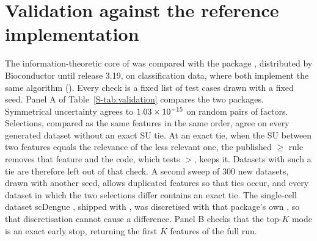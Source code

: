 \begin{table}[htbp]
\centering\footnotesize
\caption{ top-$K$ ($q = 2$), mRMR, MIM and mRMR on the two-bin target, and
the rankers at a matched panel size $K$ on the \SuppSimDatasets{} simulated datasets, as
means with Monte Carlo standard errors in brackets. Recovered: share of the three driver
clusters with a member selected. FDR: share of the selected features that are distractors
or noise. Copies: members of a driver cluster selected beyond the first. Exact: share of
folds that recover every driver cluster with no distractor or noise feature. Uno's C:
truncated.}
\label{S-tab:simmatched}

\end{table}

\section{Validation against the reference implementation}\label{S-sec:validation}

The information-theoretic core of  was compared with the  package
\citep{fcbfbioc}, distributed by Bioconductor until release 3.19, on classification data,
where both implement the same algorithm
(). Every check is a fixed
list of test cases drawn with a fixed seed. Panel A of Table~\ref{S-tab:validation}
compares the two packages. Symmetrical uncertainty agrees to $1.03 \times 10^{-15}$ on random
pairs of factors. Selections, compared as the same features in the same order, agree on
every generated dataset without an exact SU tie. At an exact tie, when the SU between two
features equals the relevance of the less relevant one, the published $\ge$ rule
\citep{yu2003} removes that feature and the  code, which tests $>$, keeps it.
Datasets with such a tie are therefore left out of that check. A second sweep of 300 new
datasets, drawn with another seed, allows duplicated features so that ties occur, and
every dataset in which the two selections differ contains an exact tie. The single-cell dataset scDengue
\citep{zanini2018}, shipped with , was discretised with that package's own
, so that discretisation cannot cause a difference. Panel B checks
that the top-$K$ mode is an exact early stop, returning the first $K$ features of the
full run.

\begin{table}[htbp]
\centering\footnotesize
\caption{Validation of the information-theoretic core. Compared: datasets, thresholds or
values of $K$ compared. At a tie: mismatches at an exact SU tie. Skipped: generated
datasets left out of the check because they contain an exact tie.}
\label{S-tab:validation}

\end{table}

